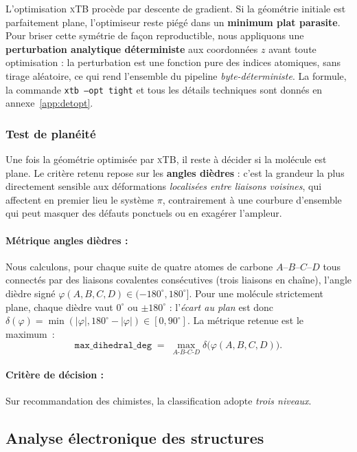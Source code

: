 \documentclass[11pt,a4paper]{article}
\newcommand{\xtb}{\textsc{xTB}}
\begin{document}
L'optimisation \xtb{} procède par descente de gradient. Si la géométrie
initiale est parfaitement plane, l'optimiseur reste piégé dans un
\textbf{minimum plat parasite}. Pour briser cette symétrie de façon
reproductible, nous appliquons une \textbf{perturbation analytique
déterministe} aux coordonnées $z$ avant toute optimisation : la
perturbation est une fonction pure des indices atomiques, sans tirage
aléatoire, ce qui rend l'ensemble du pipeline \emph{byte-déterministe}.
La formule, la commande \texttt{xtb --opt tight} et tous les détails
techniques sont donnés en annexe~\ref{app:detopt}.

\subsubsection{Test de planéité}
\label{sec:acp}

Une fois la géométrie optimisée par \xtb{}, il reste à décider si la
molécule est plane. Le critère retenu repose sur les \textbf{angles
dièdres} : c'est la grandeur la plus directement sensible aux
déformations \emph{localisées entre liaisons voisines}, qui affectent
en premier lieu le système $\pi$, contrairement à une courbure
d'ensemble qui peut masquer des défauts ponctuels ou en exagérer
l'ampleur.

\paragraph{Métrique angles dièdres : } Nous calculons, pour
chaque suite de quatre atomes de carbone $A$--$B$--$C$--$D$ tous
connectés par des liaisons covalentes consécutives (trois liaisons en
chaîne), l'angle dièdre signé $\varphi(A,B,C,D) \in (-180^\circ,
180^\circ]$. Pour une molécule strictement plane, chaque dièdre vaut
$0^\circ$ ou $\pm 180^\circ$ : l'\emph{écart au plan} est donc
$\delta(\varphi) = \min(|\varphi|, 180^\circ - |\varphi|) \in [0,
90^\circ]$. La métrique retenue est le maximum~:
\[
  \texttt{max\_dihedral\_deg}
    \;=\; \max_{A\text{-}B\text{-}C\text{-}D} \delta\bigl(\varphi(A,B,C,D)\bigr).
\]

\paragraph{Critère de décision : } Sur recommandation
des chimistes, la classification adopte \emph{trois niveaux}.

\subsection{Analyse électronique des structures}
\label{sec:analyse-elec}
\end{document}
